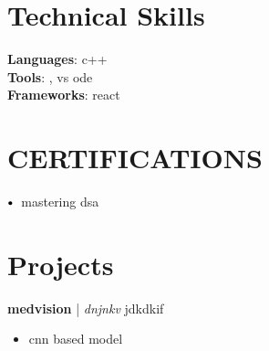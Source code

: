 \documentclass[letterpaper,11pt]{article}
\newcommand\sbullet[1][.5]{\mathbin{\vcenter{\hbox{\scalebox{#1}{$\bullet$}}}}}
\begin{document}
\section*{Technical Skills}
\textbf{Languages}: c++ \\[4pt]
\textbf{Tools}: , vs ode \\[4pt]
\textbf{Frameworks}: react \\[4pt]




%     

\section{CERTIFICATIONS}
$\sbullet[.75] \hspace{0.1cm}$ mastering dsa \\

\section*{Projects}
\textbf{medvision} \href{adsvkvknflkvl}{\faExternalLink} | \textit{dnjnkv} \hfill jdkdkif \\[2pt]
\begin{itemize}[leftmargin=*]
\item cnn based model
\end{itemize}
\end{document}
